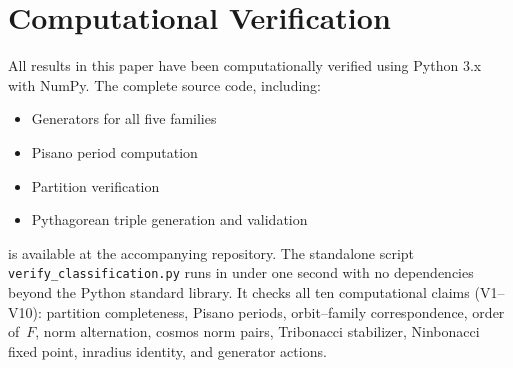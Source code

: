 \documentclass[12pt]{article}
\begin{document}
\appendix

\section{Computational Verification}

All results in this paper have been computationally verified using Python 3.x with NumPy. The complete source code, including:
\begin{itemize}
\item Generators for all five families
\item Pisano period computation
\item Partition verification
\item Pythagorean triple generation and validation
\end{itemize}

is available at the accompanying repository.  The standalone script
\texttt{verify\_classification.py} runs in under one second with no dependencies
beyond the Python standard library.  It checks all ten computational claims
(V1--V10): partition completeness, Pisano periods, orbit--family correspondence,
order of~$F$, norm alternation, cosmos norm pairs, Tribonacci stabilizer,
Ninbonacci fixed point, inradius identity, and generator actions.
\end{document}
